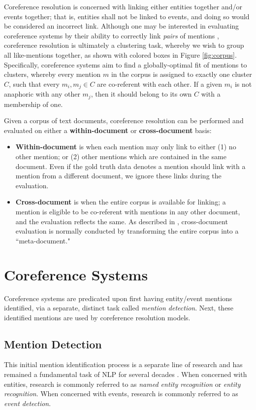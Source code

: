 Coreference resolution is concerned with linking either entities together and/or events together; that is, entities shall not be linked to events, and doing so would be considered an incorrect link.  Although one may be interested in evaluating coreference systems by their ability to correctly link \textit{pairs} of mentions \cite{parma}, coreference resolution is ultimately a clustering task, whereby we wish to group all like-mentions together, as shown with colored boxes in Figure \ref{fig:corpus}.  Specifically, coreference systems aim to find a globally-optimal fit of mentions to clusters, whereby every mention $m$ in the corpus is assigned to exactly one cluster $C$, such that every ${m_i,m_j} \in C$ are co-referent with each other.  If a given $m_i$ is not anaphoric with any other $m_j$, then it should belong to its own $C$ with a membership of one.

Given a corpus of text documents, coreference resolution can be performed and evaluated on either a \textbf{within-document} or \textbf{cross-document} basis:

\begin{itemize}
\item \textbf{Within-document} is when each mention may only link to either (1) no other mention; or (2) other mentions which are contained in the same document.  Even if the gold truth data denotes a mention should link with a mention from a different document, we ignore these links during the evaluation.
\item \textbf{Cross-document} is when the entire corpus is available for linking; a mention is eligible to be co-referent with mentions in any other document, and the evaluation reflects the same.  As described in \cite{revisit:16}, cross-document evaluation is normally conducted by transforming the entire corpus into a ``meta-document."
\end{itemize}

\section{Coreference Systems}
Coreference systems are predicated upon first having entity/event mentions identified, via a separate, distinct task called \textit{mention detection}.  Next, these identified mentions are used by coreference resolution models.

\subsection{Mention Detection}
This initial mention identification process is a separate line of research and has remained a fundamental task of NLP for several decades \cite{ner-sekine2007}.  When concerned with entities, research is commonly referred to as \textit{named entity recognition} or \textit{entity recognition}. When concerned with events, research is commonly referred to as \textit{event detection}.

